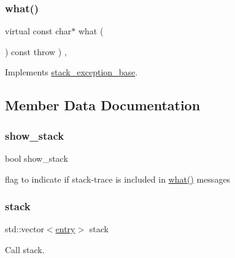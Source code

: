 \subsubsection{\texorpdfstring{what()}{what()}}
{\footnotesize\ttfamily virtual const char$\ast$ what (\begin{DoxyParamCaption}{ }\end{DoxyParamCaption}) const throw  ) \hspace{0.3cm}{\ttfamily [inline]}, {\ttfamily [virtual]}}



Implements \mbox{\hyperlink{classstacktrace_1_1stack__exception__base_a926844cae0786e6c6192f557a12e39f0}{stack\+\_\+exception\+\_\+base}}.



\subsection{Member Data Documentation}
\mbox{\label{classstacktrace_1_1stack__exception__base_a328e39311a54853f3f733b0a5be56a2a}} 
\subsubsection{\texorpdfstring{show\+\_\+stack}{show\_stack}}
{\footnotesize\ttfamily bool show\+\_\+stack\hspace{0.3cm}{\ttfamily [inherited]}}



flag to indicate if stack-\/trace is included in \mbox{\hyperlink{classstacktrace_1_1stack__exception_ad62489809e3df568e973597b928d6d9b}{what()}} messages 

\mbox{\label{classstacktrace_1_1call__stack_a2a3ab0b5bb69cd4a275f3f344d3cc6cd}} 
\subsubsection{\texorpdfstring{stack}{stack}}
{\footnotesize\ttfamily std\+::vector$<$\mbox{\hyperlink{structstacktrace_1_1entry}{entry}}$>$ stack\hspace{0.3cm}{\ttfamily [inherited]}}



Call stack. 

